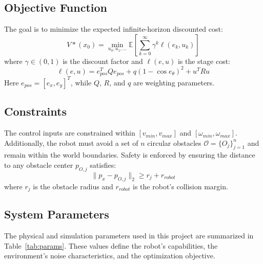 \documentclass[conference]{IEEEtran}
\begin{document}
\subsection{Objective Function}
The goal is to minimize the expected infinite-horizon discounted cost:
\begin{equation}
    V*(x_0) = \min_{u_0, u_1, \ldots} \mathbb{E} \left[ \sum_{k=0}^{\infty} \gamma^k \ell(e_k, u_k) \right]
\end{equation}
where $\gamma \in (0, 1)$ is the discount factor and $\ell(e, u)$ is the stage cost:
\begin{equation}
    \ell(e, u) = e_{pos}^T Q e_{pos} + q(1 - \cos e_{\theta})^2 + u^T R u
\end{equation}
Here $e_{pos} = [e_x, e_y]^T$, while $Q$, $R$, and $q$ are weighting parameters.

\subsection{Constraints}
The control inputs are constrained within $[v_{min}, v_{max}]$ and $[\omega_{min}, \omega_{max}]$. Additionally, the robot must avoid a set of $n$ circular obstacles $\mathcal{O} = \{O_j\}_{j=1}^n$ and remain within the world boundaries. Safety is enforced by ensuring the distance to any obstacle center $p_{O,j}$ satisfies:
\begin{equation}
    \| p_x - p_{O,j} \|_2 \geq r_j + r_{robot}
\end{equation}
where $r_j$ is the obstacle radius and $r_{robot}$ is the robot's collision margin.

\subsection{System Parameters}
The physical and simulation parameters used in this project are summarized in Table~\ref{tab:params}. These values define the robot's capabilities, the environment's noise characteristics, and the optimization objective.
\end{document}
